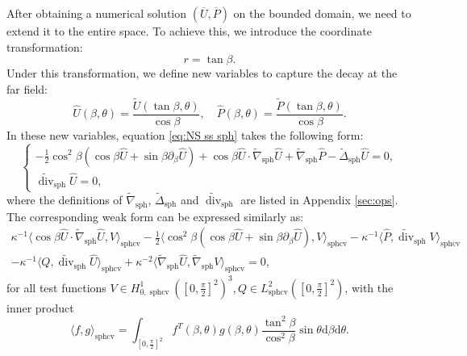 \documentclass[11pt,a4paper]{article}
\numberwithin{equation}{section}
\newcommand{\cdummy}{\cdot}
\newcommand{\mathd}{\mathrm{d}}
\newcommand{\nosymbol}{}
\newcommand{\tmop}[1]{\ensuremath{\operatorname{#1}}}
\begin{document}
After obtaining a numerical solution $(\overline{U}, \overline{P})$ on the
bounded domain, we need to extend it to the entire space. To achieve this, we
introduce the coordinate transformation:
\[ r = \tan \beta . \]
Under this transformation, we define new variables to capture the decay at the far field:
\[ \widehat{U} (\beta, \theta) = \frac{\widetilde{U} (\tan\beta, \theta)}{\cos \beta},
   \quad \widehat{P} (\beta, \theta) = \frac{\widetilde{P} (\tan\beta, \theta)}{\cos
   \beta}.\]
In these new variables, equation \eqref{eq:NS ss sph} takes the following
form:
\begin{equation*}
  \left\{\begin{array}{l}
    - \frac{1}{2} \cos^2 \beta (\cos \beta  \widehat{U} + \sin
    \beta \partial_{\beta}\widehat{U}) + \cos \beta\widehat{U} \cdot \widetilde{\nabla}_{\tmop{sph}}  \widehat{U} +
    \widetilde{\nabla}_{\tmop{sph}} \widehat{P} - \widetilde{\Delta}_{\tmop{sph}}  \widehat{U}
    = 0,\\
    \widetilde{\tmop{div}}_{\tmop{sph}}  \widehat{U} = 0,
  \end{array}\right. \label{eq:NS ss sph cv}
\end{equation*}
where the definitions of $\widetilde{\nabla}_{\tmop{sph}}$,
$\widetilde{\Delta}_{\tmop{sph}}$ and $\widetilde{\tmop{div}}_{\tmop{sph}}$ are
listed in Appendix \ref{sec:ops}. The corresponding weak form can be expressed
similarly as:
\begin{equation}
  \begin{array}{l}
    \kappa^{-1} \langle \cos \beta\widehat{U} \cdummy \widetilde{\nabla}_{\tmop{sph}} \widehat{U}, V
    \rangle_{\tmop{sphcv}} - \frac{1}{2} \langle \cos^2 \beta (\cos \beta  \widehat{U} + \sin
    \beta \partial_{\beta}\widehat{U}), V \rangle_{\tmop{sphcv}} -
    \kappa^{-1} \langle \widehat{P}, \widetilde{\tmop{div}}_{\tmop{sph}} V
    \rangle_{\tmop{sphcv}}\\
    - \kappa^{-1} \langle Q, \widetilde{\tmop{div}}_{\tmop{sph}}  \widehat{U}
    \rangle_{\tmop{sphcv}} + \kappa^{-2} \langle \widetilde{\nabla}_{\tmop{sph}}
    \widehat{U}, \widetilde{\nabla}_{\tmop{sph}} V \rangle_{\tmop{sphcv}} = 0,
  \end{array} \label{eq:weak NS sph cv} 
\end{equation}
for all test functions $V \in H^1_{0, \tmop{sphcv}} ([0, \frac\pi2]^2)^3, Q \in L^2_{\tmop{sphcv}} ([0, \frac\pi2]^2)$, with the
inner product
\[ \langle f, g \rangle_{\tmop{sphcv}} = \int_{\left[ 0, \frac{\pi}{2}
   \right]^2} f^T (\beta, \theta) \nosymbol g (\beta, \theta) \frac{\tan^2
   \beta}{\cos^2 \beta} \sin \theta \mathd \beta \mathd \theta . \]
\end{document}
